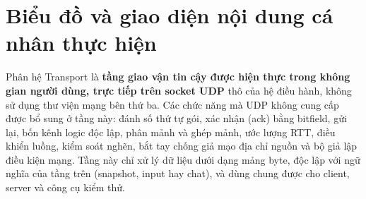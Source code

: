 

\section{Biểu đồ và giao diện nội dung cá nhân thực hiện}
Phân hệ Transport là \textbf{tầng giao vận tin cậy được hiện thực trong không gian người dùng, trực tiếp trên socket UDP} thô của hệ điều hành, không sử dụng thư viện mạng bên thứ ba. Các chức năng mà UDP không cung cấp được bổ sung ở tầng này: đánh số thứ tự gói, xác nhận (ack) bằng bitfield, gửi lại, bốn kênh logic độc lập, phân mảnh và ghép mảnh, ước lượng RTT, điều khiển luồng, kiểm soát nghẽn, bắt tay chống giả mạo địa chỉ nguồn và bộ giả lập điều kiện mạng. Tầng này chỉ xử lý dữ liệu dưới dạng mảng byte, độc lập với ngữ nghĩa của tầng trên (snapshot, input hay chat), và dùng chung được cho client, server và công cụ kiểm thử.

